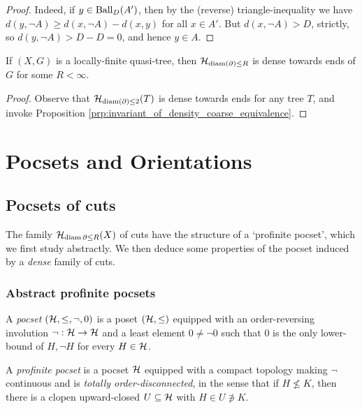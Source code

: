\documentclass{amsart}
\begin{document}
\begin{proof}
        Indeed, if $y\in\operatorname{Ball}_D(A')$, then by the (reverse) triangle-inequality we have $d(y,\lnot A)\geq d(x,\lnot A)-d(x,y)$ for all $x\in A'$. But $d(x,\lnot A)>D$, strictly, so $d(y,\lnot A)>D-D=0$, and hence $y\in A$.
    \end{proof}

    \begin{corollary}
        If $(X,G)$ is a locally-finite quasi-tree, then $\mathcal{H}_{\operatorname{diam}(\partial)\leq R}$ is dense towards ends of $G$ for some $R<\infty$.
    \end{corollary}
    \begin{proof}
        Observe that $\mathcal{H}_{\operatorname{diam}(\partial)\leq2}(T)$ is dense towards ends for any tree $T$, and invoke Proposition \ref{prp:invariant_of_density_coarse_equivalence}.
    \end{proof}

    \section{Pocsets and Orientations}

    \subsection{Pocsets of cuts}\label{sec:pocsets_of_cuts}

    The family $\mathcal{H}_{\operatorname{diam}\partial\leq R}(X)$ of cuts have the structure of a `profinite pocset', which we first study abstractly. We then deduce some properties of the pocset induced by a \textit{dense} family of cuts.

    \subsubsection{Abstract profinite pocsets}\label{ssec:profinite_pocsets}

    \begin{definition}
        A \textit{pocset} $(\mathcal{H},\leq,\lnot,0)$ is a poset $(\mathcal{H},\leq)$ equipped with an order-reversing involution $\lnot:\mathcal{H}\to\mathcal{H}$ and a least element $0\neq\lnot0$ such that $0$ is the only lower-bound of $H,\lnot H$ for every $H\in\mathcal{H}$.

        A \textit{profinite pocset} is a pocset $\mathcal{H}$ equipped with a compact topology making $\lnot$ continuous and is \textit{totally order-disconnected}, in the sense that if $H\not\leq K$, then there is a clopen upward-closed $U\subseteq\mathcal{H}$ with $H\in U\not\ni K$.
    \end{definition}
\end{document}
